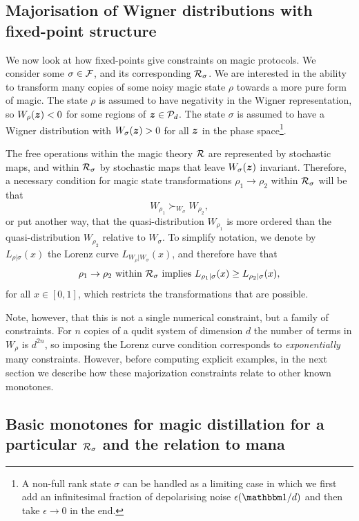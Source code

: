 \documentclass[pra,
aps,
twocolumn,
superscriptaddress,
groupedaddress,
nofootinbib,
reprint
]{revtex4-1}
\begin{document}
\subsection{Majorisation of Wigner distributions with fixed-point structure}
\label{sec:major_frag}
We now look at how fixed-points give constraints on magic protocols.
We consider some $\sigma \in {\mathcal F}$, and its corresponding ${\mathcal R}_\sigma$. We are interested in the ability to transform many copies of some noisy magic state $\rho$ towards a more pure form of magic. The state $\rho$ is assumed to have negativity in the Wigner representation, so $W_\rho(\bm{z}) < 0$ for some regions of $\bm{z} \in {\mathcal P}_d$. The state $\sigma$ is assumed to have a Wigner distribution with $W_\sigma(\bm{z}) > 0$ for all $\bm{z}$ in the phase space\footnote{A non-full rank state $\sigma$ can be handled as a limiting case in which we first add an infinitesimal fraction of depolarising noise $\epsilon (\id/d)$ and then take $\epsilon \rightarrow 0$ in the end.}.

The free operations within the magic theory ${\mathcal R}$ are represented by stochastic maps, and within ${\mathcal R}_\sigma$ by stochastic maps that leave $W_\sigma(\bm{z})$ invariant. Therefore, a necessary condition for magic state transformations $\rho_1 \rightarrow \rho_2$ within ${\mathcal R}_\sigma$ will be that 
\begin{equation}
	W_{\rho_1} \succ_{W_{\sigma}} W_{\rho_2},
\end{equation}
or put another way, that the quasi-distribution $W_{\rho_1}$ is more ordered than the quasi-distribution $W_{\rho_2}$ relative to $W_\sigma$. To simplify notation, we denote by $L_{\rho | \sigma}(x)$ the Lorenz curve $L_{W_{\rho} | W_{\sigma}} (x)$, and therefore have that
\begin{equation}
\rho_1 \rightarrow \rho_2 \mbox{ within }{\mathcal R}_\sigma \mbox{ implies } L_{\rho_1 |\sigma} (x) \ge L_{\rho_2 |\sigma} (x),
\end{equation}
for all $x \in [0,1]$, which restricts the transformations that are possible.

  Note, however, that this is not a single numerical constraint, but a family of constraints. For $n$ copies of a qudit system of dimension $d$ the number of terms in $W_{\rho}$ is $d^{2n}$, so imposing the Lorenz curve condition corresponds to \emph{exponentially} many constraints. However,  before computing explicit examples, in the next section we describe how these majorization constraints relate to other known monotones.

\subsection{Basic monotones for magic distillation for a particular ${\mathcal R}_\sigma$ and the relation to mana}
\label{sec:monotones_frag}
\end{document}
